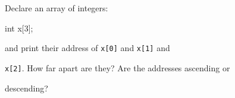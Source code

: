 Declare an array of integers:

\begin{consolethree}[escapeinside=||]

int x[3];

\end{consolethree}



and print their address of \texttt{x[0]} and \texttt{x[1]} and

\texttt{x[2]}. How far apart are they? Are the addresses ascending or

descending?

